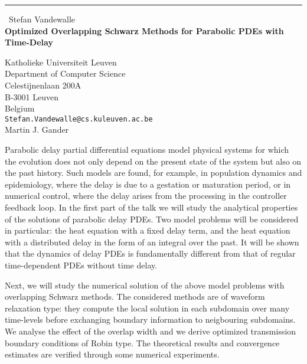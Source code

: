 \documentclass{report}
\begin{document}
\begin{center}
\rule{6in}{1pt} \
{\large Stefan Vandewalle \\
{\bf Optimized Overlapping Schwarz Methods for Parabolic PDEs with Time-Delay}}

Katholieke Universiteit Leuven \\ Department of Computer Science \\ Celestijnenlaan 200A \\ B-3001 Leuven \\ Belgium
\\
{\tt Stefan.Vandewalle@cs.kuleuven.ac.be}\\
Martin J. Gander\end{center}

Parabolic delay partial differential equations model physical systems for
which the evolution does not only depend on the present state of the
system but also on the past history. Such models are found, for example,
in population dynamics and epidemiology, where the delay is due to a
gestation or maturation period, or in numerical control, where the delay
arises from the processing in the controller feedback loop.
In the first part of the talk we will study the analytical properties of
the solutions of parabolic delay PDEs. Two model problems will be
considered in particular: the heat equation with a fixed delay term, and
the heat equation with a distributed delay in the form of an integral
over the past. It will be shown that the dynamics of delay PDEs is
fundamentally different from that of regular time-dependent PDEs without
time delay.

Next, we will study the numerical solution of the above model problems
with overlapping Schwarz methods. The considered methods are of waveform
relaxation type: they compute the local solution in each subdomain over
many time-levels before exchanging boundary information to neigbouring
subdomains. We analyse the effect of the overlap width and we derive
optimized transmission boundary conditions of Robin type. The theoretical
results and convergence estimates are verified through some numerical
experiments.
\end{document}
